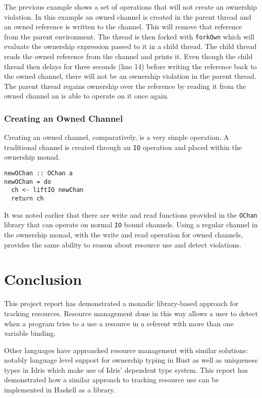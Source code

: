 \documentclass[onehalf,11pt]{beavtex}
\begin{document}
The previous example shows a set of operations that will not create an ownership
violation. In this example an owned channel is created in the parent thread and
an owned reference is written to the channel.
This will remove that reference from the parent environment.
The thread is then forked with \texttt{forkOwn} which will evaluate the
ownership expression passed to it in a child thread.
The child thread reads the owned reference from the channel and prints it.
Even though the child thread then delays for three seconds (line 14) before
writing the reference back to the owned channel, there will not be an ownership
violation in the parent thread.
The parent thread regains ownership over the reference by reading it from the
owned channel an is able to operate on it once again.

\subsection{Creating an Owned Channel}

Creating an owned channel, comparatively, is a very simple operation.
A traditional channel is created through an \texttt{IO} operation and placed
within the ownership monad.

\begin{verbatim}
newOChan :: OChan a
newOChan = do
  ch <- liftIO newChan
  return ch
\end{verbatim}

It was noted earlier that there are write and read functions provided
in the \texttt{OChan} library that can operate on normal \texttt{IO} bound
channels.  Using a regular channel in the ownership monad,
with the write and read operation for owned channels,
provides the same ability to reason about resource use and detect violations.



\chapter{Conclusion}

This project report has demonstrated a monadic library-based approach for
tracking resources.
Resource management done in this way allows a user to detect when a program
tries to a use a resource in a referent with more than one variable binding.

Other languages have approached resource management with similar
solutions: notably language level support for ownership typing in Rust as well
as uniqueness types in Idris which make use of Idris' dependent type system.
This report has demonstrated how a similar approach to tracking resource use can be
implemented in Haskell as a library.
\end{document}
